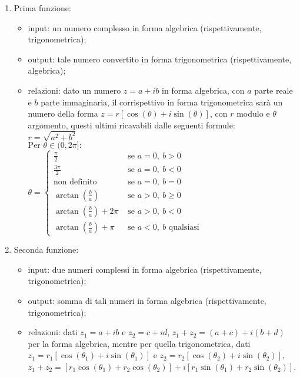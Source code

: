 \documentclass[a4paper,10pt]{article}
\begin{document}
\begin{enumerate}
	\item Prima funzione:
	    \begin{itemize}
	    	\item input: un numero complesso in forma algebrica (rispettivamente, trigonometrica);
		\item output: tale numero convertito in forma trigonometrica (rispettivamente, algebrica);
		\item relazioni: dato un numero $z = a + ib $ in forma algebrica,
		con $a$ parte reale e $b$ parte immaginaria, il corrispettivo in forma trigonometrica sarà un
		numero della forma $z = r[\cos(\theta) + i\sin(\theta)]$, con $r$ modulo e $\theta$ argomento,
		questi ultimi ricavabili dalle seguenti formule:\\
		$ r = \sqrt{a^2 + b^2} $\\					%
		$ \mbox{Per }\theta \in (0,2\pi]: $\\				%
		$
		\theta = 
		    \begin{cases}
		    	\frac{\pi}{2} & \mbox{ se } a = 0,\ b > 0\\
			\frac{3\pi}{2} & \mbox{ se } a = 0,\ b < 0\\
			\mbox{non definito} & \mbox{ se } a = 0,\ b = 0\\
			\arctan{\left(\frac{b}{a}\right)} & \mbox{ se } a > 0,\ b \geq 0\\
			\arctan{\left(\frac{b}{a}\right)} + 2\pi & \mbox{ se } a > 0,\ b < 0\\
			\arctan{\left(\frac{b}{a}\right)} + \pi & \mbox{ se } a < 0,\ b \mbox{ qualsiasi}
		    \end{cases}
		$
	    \end{itemize}
	\item Seconda funzione:
	    \begin{itemize}
	    	\item input: due numeri complessi in forma algebrica (rispettivamente, trigonometrica);
		\item output: somma di tali numeri in forma algebrica (rispettivamente, trigonometrica);
		\item relazioni: dati $ z_1 = a + ib $ e $ z_2 = c + id $, $ z_1 + z_2 = (a + c) + i(b + d) $
		per la forma algebrica, mentre per quella trigonometrica, dati $ z_1 = r_1[\cos(\theta_1) + i\sin(\theta_1)] $
		e $ z_2 = r_2[\cos(\theta_2) + i\sin(\theta_2)] $, $ z_1 + z_2 = [r_1\cos(\theta_1) + r_2\cos(\theta_2)] +
		i[r_1\sin(\theta_1) + r_2\sin(\theta_2)] $.

\end{itemize}
\end{enumerate}
\end{document}

